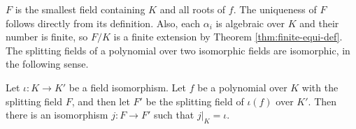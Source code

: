 $F$ is the smallest field containing $K$ and all roots of $f$. The uniqueness of $F$ follows directly from its definition. Also, each $\alpha_i$ is algebraic over $K$ and their number is finite, so $F / K$ is a finite extension by Theorem \ref{thm:finite-equi-def}. 
%
%
The splitting fields of a polynomial over two isomorphic fields are isomorphic, in the following sense.

\begin{theorem} \label{thm:splitting-field-unique}
	Let $\iota: K \to K'$ be a field isomorphism. Let $f$ be a polynomial over $K$ with the splitting field $F$, and then let $F'$ be the splitting field of $\iota(f)$ over $K'$. Then there is an isomorphism $j : F \to F'$ such that $j | _K = \iota$. 
\end{theorem}

